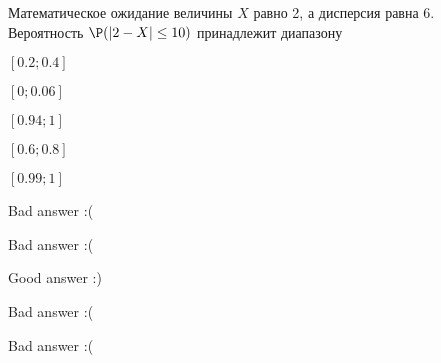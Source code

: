 
\begin{question}
Математическое ожидание величины \(X\) равно 2, а дисперсия равна 6.
Вероятность \(\P(|2-X|\leq 10)\) принадлежит диапазону
\begin{answerlist}
  \item \([0.2;0.4]\)
  \item \([0; 0.06]\)
  \item \([0.94; 1]\)
  \item \([0.6; 0.8]\)
  \item \([0.99;1]\)
\end{answerlist}
\end{question}

\begin{solution}
\begin{answerlist}
  \item Bad answer :(
  \item Bad answer :(
  \item Good answer :)
  \item Bad answer :(
  \item Bad answer :(
\end{answerlist}
\end{solution}

